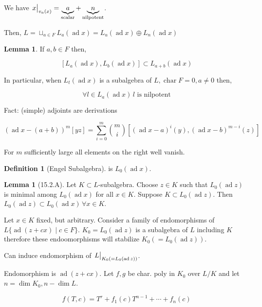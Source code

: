 \documentclass{article}
\theoremstyle{definition}
\newtheorem*{definition}{Definition}
\newtheorem{lemma}[theorem]{Lemma}
\begin{document}
We have \(\eval{x}_{v_a(x)}^{} = \underbrace{a}_{\text{scalar}} + \underbrace{n}_{\text{nilpotent}} \).

Then, \(L = \sqcup_{a\in F} L_a (\operatorname{ad} x) = L_u (\operatorname{ad} x) \oplus L_n(\operatorname{ad} x)\) 

\begin{lemma}
    If \(a,b\in F\) then,

    \[
        [L_a(\operatorname{ad} x), L_b(\operatorname{ad} x)] \subset L_{a+b}(\operatorname{ad} x)
    \]

    In particular, when \(L_t(\operatorname{ad} x)\) is a subalgebra of \(L, \operatorname{char} F = 0, a \neq 0\) then,
    
    \[
        \forall l \in L_a(\operatorname{ad} x)\, l \text{ is nilpotent} 
    \]
\end{lemma}

Fact: (simple) adjoints are derivations

\[
    (\operatorname{ad} x - (a+b))^m [yz] = \sum_{i=0}^m \binom{m}{i}[(\operatorname{ad} x - a)^i (y), (\operatorname{ad} x - b)^{m-i}(z)]  
\]

For \(m\) sufficiently large all elements on the right well vanish.

\begin{definition}
    [Engel Subalgebra] is \(L_0(\operatorname{ad} x)\).
\end{definition}

\begin{lemma}
    [15.2.A] Let \(K \subset L\)-subalgebra. Choose \(z\in K\) such that \(L_0(\operatorname{ad} z)\) is minimal among \(L_0(\operatorname{ad} x)\) for all \(x\in K\). Suppose \(K \subset L_0(\operatorname{ad} z)\). Then \(L_0(\operatorname{ad} z) \subset L_0(\operatorname{ad} x) \, \forall x\in K\).  
\end{lemma}

Let \(x\in K\) fixed, but arbitrary. Consider a family of endomorphisms of \(L \{ \operatorname{ad} (z+cx) \mid c\in F \} \). \(K_0 = L_0(\operatorname{ad} z)\) is a subalgebra of \(L\) including \(K\) therefore these endoomorphisms will stabilize \(K_0(=L_0(\operatorname{ad} z))\).

Can induce endomorphism of \(\eval{L}_{K_0(=L_0(\operatorname{ad} z))}^{} \).

Endomorphism is \(\operatorname{ad} (z + cx)\). Let \(f,g\) be char. poly in \(K_0\) over \(L / K\) and let \(n = \dim K_0, n - \dim L\).

\[
    f(T,c) = T^r + f_1(c) T^{n-1} + \cdots + f_n(c)
\]
\end{document}
